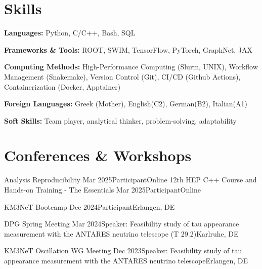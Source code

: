 \documentclass[letterpaper,11pt]{article}
\begin{document}
\section{Skills}
  \vspace{2pt}
  \resumeSubHeadingListStart
    \small{\item{
        
        \textbf{Languages:}{ Python, C/C++, Bash, SQL} \\ \vspace{3pt}

        \textbf{Frameworks \& Tools:}{ ROOT, SWIM, TensorFlow, PyTorch, GraphNet, JAX} 
        
        \textbf{Computing Methods:}{ High-Performance Computing (Slurm, UNIX), Workflow Management (Snakemake), Version Control (Git), CI/CD (Github Actions), Containerization (Docker, Apptainer)} \\ \vspace{3pt}

        \textbf{Foreign Languages:} {Greek (Mother), English(C2), German(B2), Italian(A1)} \\ \vspace{3pt}

        \textbf{Soft Skills:}{ Team player, analytical thinker, problem-solving, adaptability} \\ \vspace{3pt}
    }}
  \resumeSubHeadingListEnd


\section{Conferences \& Workshops}
\resumeSubHeadingListStart
      \resumeSubheading
      {Analysis Reproducibility}
      {Mar 2025}{Participant}{Online}
      \resumeSubheading
      {12th HEP C++ Course and Hands-on Training - The Essentials}
      {Mar 2025}{Participant}{Online}
      
      \resumeSubheading
      {KM3NeT Bootcamp}
      {Dec 2024}{Participant}{Erlangen, DE}
      
      \resumeSubheading
      {DPG Spring Meeting}
      {Mar 2024}{Speaker: Feasibility study of tau appearance measurement with the ANTARES neutrino telescope (T 29.2)}{Karlruhe, DE}

      \resumeSubheading
      {KM3NeT Oscillation WG Meeting}
      {Dec 2023}{Speaker: Feasibility study of tau appearance measurement with the ANTARES neutrino telescope}{Erlangen, DE}
\end{document}
